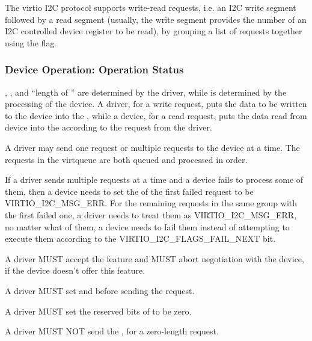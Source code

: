 The virtio I2C protocol supports write-read requests, i.e. an I2C write segment
followed by a read segment (usually, the write segment provides the number of an
I2C controlled device register to be read), by grouping a list of requests
together using the  flag.

\subsubsection{Device Operation: Operation Status}\label{sec:Device Types / I2C Adapter Device / Device Operation: Operation Status}

, , and ``length of '' are determined by the
driver, while  is determined by the processing of the device.  A
driver, for a write request, puts the data to be written to the device into the
, while a device, for a read request, puts the data read from device
into the  according to the request from the driver.

A driver may send one request or multiple requests to the device at a time.
The requests in the virtqueue are both queued and processed in order.

If a driver sends multiple requests at a time and a device fails to process
some of them, then a device needs to set the  of the first failed request
to be VIRTIO_I2C_MSG_ERR. For the remaining requests in the same group with
the first failed one, a driver needs to treat them as VIRTIO_I2C_MSG_ERR, no matter
what  of them, a device needs to fail them instead of attempting to
execute them according to the VIRTIO_I2C_FLAGS_FAIL_NEXT bit.


A driver MUST accept the  feature and
MUST abort negotiation with the device, if the device doesn't offer this
feature.

A driver MUST set  and  before sending the request.

A driver MUST set the reserved bits of  to be zero.

A driver MUST NOT send the , for a zero-length request.

